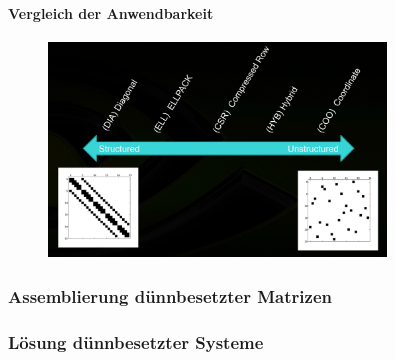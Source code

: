 \documentclass[crop=false]{standalone}
\begin{document}
        \paragraph{Vergleich der Anwendbarkeit} %
        \label{par:vergleich_der_anwendbarkeit}
          \begin{figure}[h]
            \center
            \includegraphics[width=0.8\textwidth]{images/comparison_sparse_matrix_formats.png}
          \end{figure}

      \subsubsection{Assemblierung dünnbesetzter Matrizen} %
      \label{ssub:assemblierung_dünnbesetzter_matrizen}


      \subsubsection{Lösung dünnbesetzter Systeme} %
      \label{ssub:lösung_dünnbesetzter_systeme}
        \cite[S.~101~ff]{Nocedal2006}
\end{document}
